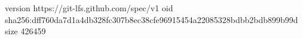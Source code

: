 version https://git-lfs.github.com/spec/v1
oid sha256:dff760da7d1a4db328fc307b8ec38cfe96915454a22085328bdbb2bdb899b99d
size 426459
